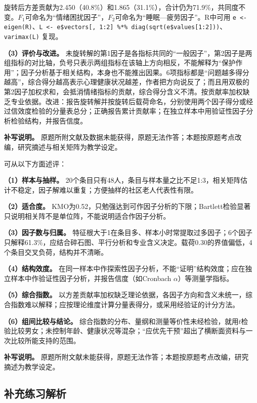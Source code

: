 旋转后方差贡献为2.450（40.8\%）和1.865（31.1\%），合计仍为71.9\%，共同度不变。\(F_1\)可命名为``情绪困扰因子''，\(F_2\)可命名为``睡眠---疲劳因子''。R中可用 \texttt{e <- eigen(R)}、\texttt{L <- e\$vectors[, 1:2] \%*\% diag(sqrt(e\$values[1:2]))}、\texttt{varimax(L)} 复现。

\textbf{（3）评价与改进。} 未旋转解的第1因子是各指标共同的``一般因子''，第2因子是两组指标的对比轴，负号只表示两组指标在该轴上方向相反，不能解释为``保护作用''；因子分析基于相关结构，本身也不能推出因果。6项指标都是``问题越多得分越高''，综合得分越高表示心理健康状况越差，作者把方向说反了；而且用双极的第2因子加权求和，会抵消情绪指标的贡献，综合得分含义不清。按贡献率加权缺乏专业依据。改进：报告旋转解并按旋转后载荷命名，分别使用两个因子得分或经过信效度检验的分量表总分；正确报告累计贡献率；在独立样本中用验证性因子分析检验结构，并报告信度。

\textbf{补写说明。} 原题所附文献及数据未能获得，原题无法作答；本题按原题考点改编，研究摘述与相关矩阵为教学设定。



可从以下方面述评：

\textbf{（1）样本与抽样。} 20个条目只有48人，条目与样本量之比不足1:3，相关矩阵估计不稳定，因子解难以重复；方便抽样的社区老人代表性有限。

\textbf{（2）适合度。} KMO为0.52，只勉强达到可作因子分析的下限；Bartlett检验显著只说明相关阵不是单位阵，不能说明适合作因子分析。

\textbf{（3）因子数与归属。} 特征根大于1在条目多、样本小时常提取过多因子；6个因子只解释61.3\%，应结合碎石图、平行分析和专业含义决定。载荷0.30的界值偏低，4个条目交叉负荷，结构并不清晰。

\textbf{（4）结构效度。} 在同一样本中作探索性因子分析，不能``证明''结构效度；应在独立样本中作验证性因子分析，并报告信度（如Cronbach \(\alpha\)）等测量学指标。

\textbf{（5）综合指数。} 以方差贡献率加权缺乏理论依据，各因子方向和含义未统一，综合指数难以解释；应按理论维度计算分量表得分，或采用经验证的计分方法。

\textbf{（6）组间比较与结论。} 综合指数的分布、量纲和测量等价性未经检验，就用\(t\)检验比较男女；未控制年龄、健康状况等混杂；``应优先干预''超出了横断面资料与一次比较所能支持的范围。

\textbf{补写说明。} 原题所附文献未能获得，原题无法作答；本题按原题考点改编，研究摘述为教学设定。


\subsection{补充练习解析}

